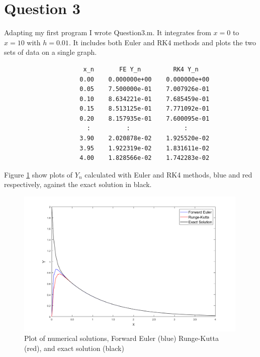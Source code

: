 \documentclass[a4paper]{article}
\begin{document}
\section*{Question 3}
Adapting my first program I wrote Question\textunderscore3.m. It integrates from $x=0$ to $x=10$ with $h=0.01$. It includes both Euler and RK4 methods and plots the two sets of data on a single graph.
\begin{table}[H]
\begin{verbatim}
                      x_n       FE Y_n         RK4 Y_n 
                     0.00    0.000000e+00    0.000000e+00 
                     0.05    7.500000e-01    7.007926e-01 
                     0.10    8.634221e-01    7.685459e-01 
                     0.15    8.513125e-01    7.771092e-01 
                     0.20    8.157935e-01    7.600095e-01 
                       :          :               : 
                     3.90    2.020878e-02    1.925520e-02 
                     3.95    1.922319e-02    1.831611e-02 
                     4.00    1.828566e-02    1.742283e-02
\end{verbatim}
\caption{Output from Question\textunderscore3.m which shows a selection of iterations form the the intergration}
\end{table}
Figure \ref{FQ3} show plots of $Y_n$ calculated with Euler and RK4 methods, blue and red respectively, against the exact solution in black.
\begin{figure}[H]
\centering
\includegraphics[width=0.99\textwidth]{Q3_both.png}
\caption{Plot of numerical solutions, Forward Euler (blue) Runge-Kutta (red), and exact solution (black)}
\label{FQ3}
\end{figure}
\end{document}
